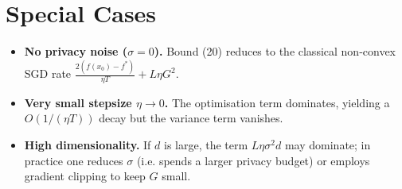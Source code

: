 \documentclass[11pt]{article}
\begin{document}
\section*{Special Cases}
\begin{itemize}
    \item \textbf{No privacy noise ($\sigma=0$).} Bound (20) reduces to the classical non‑convex SGD rate
    $\frac{2(f(x_0)-f^{*})}{\eta T}+L\eta G^{2}$.
    \item \textbf{Very small stepsize $\eta\to 0$.} The optimisation term dominates, yielding a $O(1/(\eta T))$ decay but the variance term vanishes.
    \item \textbf{High dimensionality.} If $d$ is large, the term $L\eta\sigma^{2}d$ may dominate; in practice one reduces $\sigma$ (i.e. spends a larger privacy budget) or employs gradient clipping to keep $G$ small.
\end{itemize}
\end{document}
